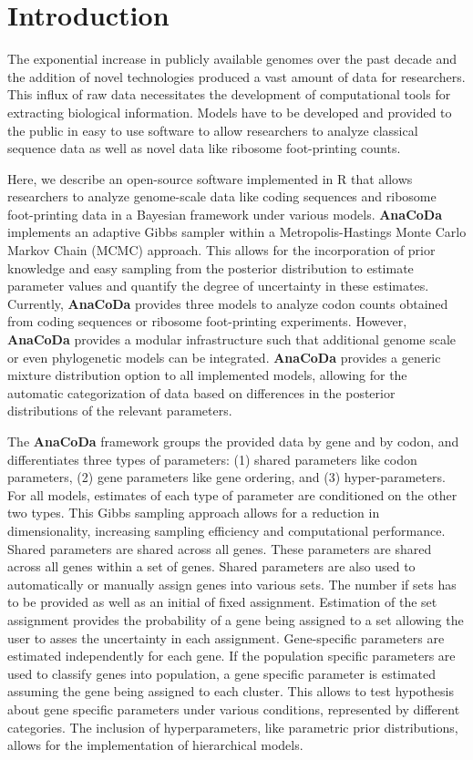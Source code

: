 \documentclass{bioinfo}
\newcommand{\package}{\textbf{AnaCoDa }} %
\begin{document}
\section*{Introduction}
The exponential increase in publicly available genomes over the past decade and the addition of novel technologies produced a vast amount of data for researchers.  
This influx of raw data necessitates the development of computational tools for extracting biological information. 
Models have to be developed and provided to the public in easy to use software to allow researchers to analyze classical sequence data as well as novel data like ribosome foot-printing counts.

Here, we describe an open-source software implemented in R \citep{rcore} that allows researchers to analyze genome-scale data like coding sequences and ribosome foot-printing data in a Bayesian framework under various models. 
\package implements an adaptive Gibbs sampler within a Metropolis-Hastings Monte Carlo Markov Chain (MCMC) approach. This allows for the incorporation of prior knowledge and easy sampling from the posterior distribution to estimate parameter values and quantify the degree of uncertainty in these estimates.
Currently, \package provides three models to analyze codon counts obtained from coding sequences or ribosome foot-printing experiments. However, \package provides a modular infrastructure such that additional genome scale or even phylogenetic models can be integrated. 
\package provides a generic mixture distribution option to all implemented models, allowing for the automatic categorization of data based on differences in the posterior distributions of the relevant parameters.

The \package framework groups the provided data by gene and by codon, and differentiates three types of parameters: (1) shared parameters like codon parameters, (2) gene parameters like gene ordering, and (3) hyper-parameters. 
For all models, estimates of each type of parameter are conditioned on the other two types. 
This Gibbs sampling approach allows for a reduction in dimensionality, increasing sampling efficiency and computational performance.
Shared parameters are shared across all genes. These parameters are shared across all genes within a set of genes. Shared parameters are also used to automatically or manually assign genes into various sets. The number if sets has to be provided as well as an initial of fixed assignment.
Estimation of the set assignment provides the probability of a gene being assigned to a set allowing the user to asses the uncertainty in each assignment.
Gene-specific parameters are estimated independently for each gene. If the population specific parameters are used to classify genes into population, a gene specific parameter is estimated assuming the gene being assigned to each cluster. This allows to test hypothesis about gene specific parameters under various conditions, represented by different categories.
The inclusion of hyperparameters, like parametric prior distributions, allows for the implementation of hierarchical models.
\end{document}
